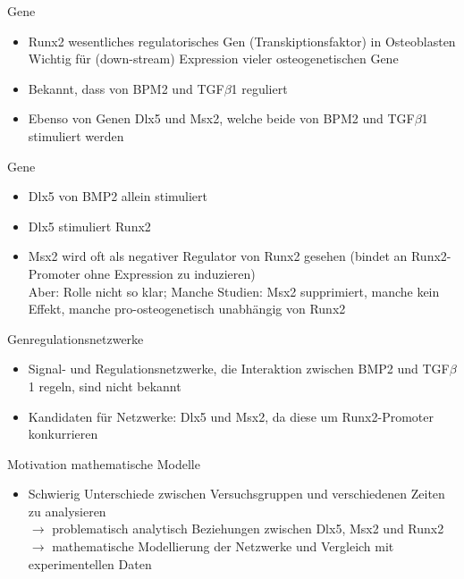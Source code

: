 \documentclass[handout]{beamer}
\begin{document}
\begin{frame}{Gene}
\begin{itemize}
	\item Runx2 wesentliches regulatorisches Gen (Transkiptionsfaktor) in Osteoblasten
	\pause
	\\ Wichtig f\"ur (down-stream) Expression vieler osteogenetischen Gene
	\pause
	\item Bekannt, dass von BPM2 und TGF$\beta$1 reguliert
	\pause
	\item Ebenso von Genen Dlx5 und Msx2, welche beide von BPM2 und TGF$\beta$1 stimuliert werden
\end{itemize}
\end{frame}

\begin{frame}{Gene}
\begin{itemize}
	\item Dlx5 von BMP2 allein stimuliert
	\pause
	\item Dlx5 stimuliert Runx2
	\pause
	\item Msx2 wird oft als negativer Regulator von Runx2 gesehen (bindet an Runx2-Promoter ohne Expression zu induzieren)
	\pause
	\\ Aber: Rolle nicht so klar; Manche Studien: Msx2 supprimiert, manche kein Effekt, manche pro-osteogenetisch unabh\"angig von Runx2
\end{itemize}
\end{frame}

\begin{frame}{Genregulationsnetzwerke}
\begin{itemize}
	\item Signal- und Regulationsnetzwerke, die Interaktion zwischen BMP2 und TGF$\beta$1 regeln, sind nicht bekannt
	\pause
	\item Kandidaten f\"ur Netzwerke: Dlx5 und Msx2, da diese um Runx2-Promoter konkurrieren
\end{itemize}
\end{frame}

\begin{frame}{Motivation mathematische Modelle}
\begin{itemize}
	\item Schwierig Unterschiede zwischen Versuchsgruppen und verschiedenen Zeiten zu analysieren
	\pause
	\\ $\rightarrow$ problematisch analytisch Beziehungen zwischen Dlx5, Msx2 und Runx2
	\\ $\rightarrow$ mathematische Modellierung der Netzwerke und Vergleich mit experimentellen Daten
\end{itemize}
\end{frame}
\end{document}
